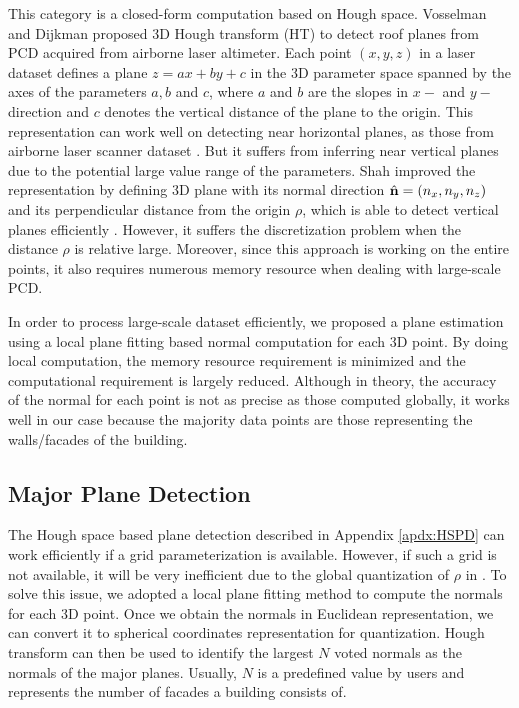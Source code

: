 \begin{enumerate}
This category is a closed-form computation based on Hough space.
Vosselman and Dijkman \cite{NE_VD} proposed 3D Hough transform (HT)
to detect roof planes from PCD acquired from airborne laser altimeter.
Each point $(x, y, z)$ in a laser dataset
defines a plane $z = ax + by + c$ in the 3D parameter space
spanned by the axes of the parameters $a, b$ and $c$,
where $a$ and $b$ are the slopes in $x-$ and $y-$ direction
and $c$ denotes the vertical distance of the plane to the origin.
This representation can work well on detecting near horizontal planes,
as those from airborne laser scanner dataset \cite{NE_GV}.
But it suffers from inferring near vertical planes
due to the potential large value range of the parameters.
Shah improved the representation by defining 3D plane with
its normal direction $\hat{\bf n} = (n_x, n_y, n_z)$ and
its perpendicular distance from the origin $\rho$, which
is able to detect vertical planes efficiently \cite{NE_TRS}.
However, it suffers the discretization problem
when the distance $\rho$ is relative large.
Moreover, since this approach is working on the entire points,
it also requires numerous memory resource when dealing with large-scale PCD.

\end{enumerate}

In order to process large-scale dataset efficiently,
we proposed a plane estimation using
a local plane fitting based normal computation for each 3D point.
By doing local computation, the memory resource requirement is minimized
and the computational requirement is largely reduced.
Although in theory, the accuracy of the normal for each point
is not as precise as those computed globally,
it works well in our case because the majority data points are
those representing the walls/facades of the building.

\subsection{Major Plane Detection}
\label{sec:HS_PD}

The Hough space based plane detection described in Appendix \ref{apdx:HSPD}
can work efficiently if a grid parameterization is available.
However, if such a grid is not available, it will be very inefficient
due to the global quantization of $\rho$ in .
To solve this issue, we adopted a local plane fitting method
to compute the normals for each 3D point.
Once we obtain the normals in Euclidean representation,
we can convert it to spherical coordinates representation for quantization.
Hough transform can then be used to identify
the largest $N$ voted normals as the normals of the major planes.
Usually, $N$ is a predefined value by users and represents the number of
facades a building consists of.


